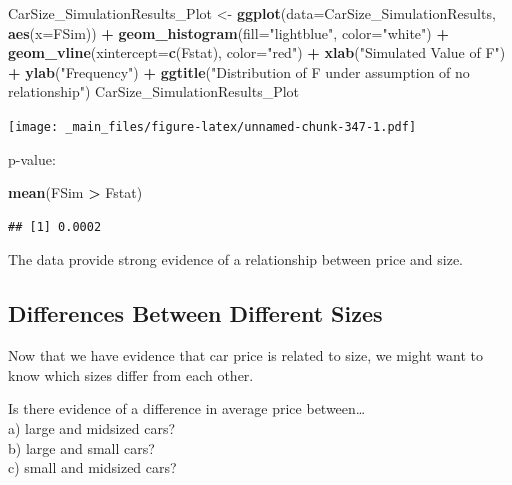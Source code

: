 \documentclass[]{book}
\newenvironment{Shaded}{\begin{snugshade}}{\end{snugshade}}
\newcommand{\KeywordTok}[1]{\textcolor[rgb]{0.13,0.29,0.53}{\textbf{#1}}}
\newcommand{\DataTypeTok}[1]{\textcolor[rgb]{0.13,0.29,0.53}{#1}}
\newcommand{\StringTok}[1]{\textcolor[rgb]{0.31,0.60,0.02}{#1}}
\newcommand{\OperatorTok}[1]{\textcolor[rgb]{0.81,0.36,0.00}{\textbf{#1}}}
\newcommand{\NormalTok}[1]{#1}
\begin{document}
\begin{Shaded}
\begin{Highlighting}[]
\NormalTok{CarSize_SimulationResults_Plot <-}\StringTok{ }\KeywordTok{ggplot}\NormalTok{(}\DataTypeTok{data=}\NormalTok{CarSize_SimulationResults, }\KeywordTok{aes}\NormalTok{(}\DataTypeTok{x=}\NormalTok{FSim)) }\OperatorTok{+}\StringTok{ }
\StringTok{  }\KeywordTok{geom_histogram}\NormalTok{(}\DataTypeTok{fill=}\StringTok{"lightblue"}\NormalTok{, }\DataTypeTok{color=}\StringTok{"white"}\NormalTok{) }\OperatorTok{+}\StringTok{  }\KeywordTok{geom_vline}\NormalTok{(}\DataTypeTok{xintercept=}\KeywordTok{c}\NormalTok{(Fstat), }\DataTypeTok{color=}\StringTok{"red"}\NormalTok{) }\OperatorTok{+}\StringTok{ }
\StringTok{  }\KeywordTok{xlab}\NormalTok{(}\StringTok{"Simulated Value of F"}\NormalTok{) }\OperatorTok{+}\StringTok{ }\KeywordTok{ylab}\NormalTok{(}\StringTok{"Frequency"}\NormalTok{) }\OperatorTok{+}\StringTok{  }\KeywordTok{ggtitle}\NormalTok{(}\StringTok{"Distribution of F under assumption of no relationship"}\NormalTok{)}
\NormalTok{CarSize_SimulationResults_Plot}
\end{Highlighting}
\end{Shaded}

\texttt{[image: \_main\_files/figure-latex/unnamed-chunk-347-1.pdf]}

p-value:

\begin{Shaded}
\begin{Highlighting}[]
\KeywordTok{mean}\NormalTok{(FSim }\OperatorTok{>}\StringTok{ }\NormalTok{Fstat)}
\end{Highlighting}
\end{Shaded}

\begin{verbatim}
## [1] 0.0002
\end{verbatim}

The data provide strong evidence of a relationship between price and
size.

\subsection{Differences Between Different
Sizes}\label{differences-between-different-sizes}

Now that we have evidence that car price is related to size, we might
want to know which sizes differ from each other.

Is there evidence of a difference in average price between\ldots{}\\
a) large and midsized cars?\\
b) large and small cars?\\
c) small and midsized cars?
\end{document}
